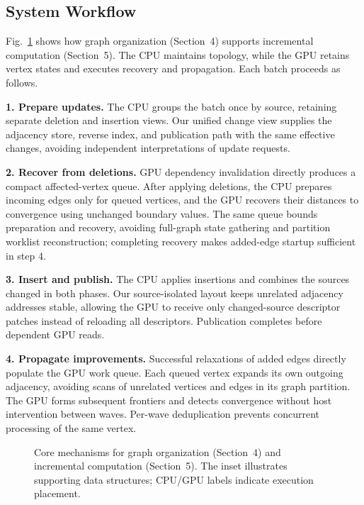 \subsection{System Workflow}


Fig.~\ref{fig:1} shows how graph organization (Section~4) supports incremental computation (Section~5). The CPU maintains topology, while the GPU retains vertex states and executes recovery and propagation. Each batch proceeds as follows.

\textbf{1. Prepare updates.} The CPU groups the batch once by source, retaining separate deletion and insertion views. Our unified change view supplies the adjacency store, reverse index, and publication path with the same effective changes, avoiding independent interpretations of update requests.

\textbf{2. Recover from deletions.} GPU dependency invalidation directly produces a compact affected-vertex queue. After applying deletions, the CPU prepares incoming edges only for queued vertices, and the GPU recovers their distances to convergence using unchanged boundary values. The same queue bounds preparation and recovery, avoiding full-graph state gathering and partition worklist reconstruction; completing recovery makes added-edge startup sufficient in step 4.

\textbf{3. Insert and publish.} The CPU applies insertions and combines the sources changed in both phases. Our source-isolated layout keeps unrelated adjacency addresses stable, allowing the GPU to receive only changed-source descriptor patches instead of reloading all descriptors. Publication completes before dependent GPU reads.

\textbf{4. Propagate improvements.} Successful relaxations of added edges directly populate the GPU work queue. Each queued vertex expands its own outgoing adjacency, avoiding scans of unrelated vertices and edges in its graph partition. The GPU forms subsequent frontiers and detects convergence without host intervention between waves. Per-wave deduplication prevents concurrent processing of the same vertex.


\begin{figure}[t]
\centering
{}
\caption{Core mechanisms for graph organization (Section~4) and incremental computation (Section~5). The inset illustrates supporting data structures; CPU/GPU labels indicate execution placement.}
\label{fig:1}
\end{figure}

